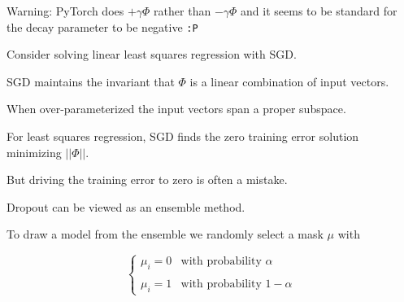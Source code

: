 {\vfill
Warning: PyTorch does $+\gamma\Phi$ rather than $-\gamma\Phi$ and it seems to be standard for the decay parameter to be negative {\large \tt :P}



Consider solving linear least squares regression with SGD.

\vfill
SGD maintains the invariant that $\Phi$ is a linear combination of input vectors.

\vfill
When over-parameterized the input vectors span a proper subspace.

\vfill
For least squares regression, SGD finds the zero training error solution minimizing $||\Phi||$.

\vfill
But driving the training error to zero is often a mistake.



Dropout can be viewed as an ensemble method.


\vfill
To draw a model from the ensemble we randomly select a mask $\mu$ with

$$\left\{\begin{array}{ll} \mu_i = 0 & \mbox{with probability $\alpha$} \\ \\ \mu_i = 1 & \mbox{with probability $1-\alpha$}
\end{array}\right.$$

}
